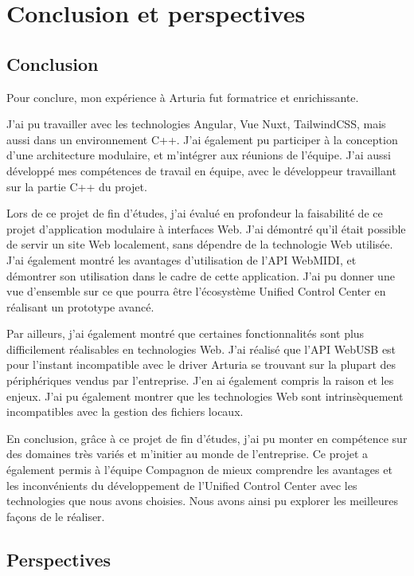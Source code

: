 \documentclass[francais]{rapportPFE}  %
\begin{document}
\section{Conclusion et perspectives}
\subsection{Conclusion}

Pour conclure, mon expérience à Arturia fut formatrice et enrichissante.

J'ai pu travailler avec les technologies Angular, Vue Nuxt, TailwindCSS, mais aussi dans un environnement C++. J'ai également pu participer à la conception d'une architecture modulaire, et m'intégrer aux réunions de l'équipe. J'ai aussi développé mes compétences de travail en équipe, avec le développeur travaillant sur la partie C++ du projet.

Lors de ce projet de fin d'études, j'ai évalué en profondeur la faisabilité de ce projet d'application modulaire à interfaces Web. J'ai démontré qu'il était possible de servir un site Web localement, sans dépendre de la technologie Web utilisée. J'ai également montré les avantages d'utilisation de l'API WebMIDI, et démontrer son utilisation dans le cadre de cette application. J'ai pu donner une vue d'ensemble sur ce que pourra être l'écosystème Unified Control Center en réalisant un prototype avancé. 

Par ailleurs, j'ai également montré que certaines fonctionnalités sont plus difficilement réalisables en technologies Web. J'ai réalisé que l'API WebUSB est pour l'instant incompatible avec le driver Arturia se trouvant sur la plupart des périphériques vendus par l'entreprise. J'en ai également compris la raison et les enjeux. J'ai pu également montrer que les technologies Web sont intrinsèquement incompatibles avec la gestion des fichiers locaux.

En conclusion, grâce à ce projet de fin d'études, j'ai pu monter en compétence sur des domaines très variés et m'initier au monde de l'entreprise. Ce projet a également permis à l'équipe Compagnon de mieux comprendre les avantages et les inconvénients du développement de l'Unified Control Center avec les technologies que nous avons choisies. Nous avons ainsi pu explorer les meilleures façons de le réaliser.

\subsection{Perspectives}
\end{document}
